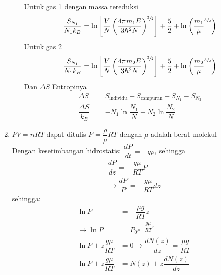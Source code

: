 \begin{enumerate}
\begin{enumerate}[(a)]
\begin{equation*}
    \end{equation*}
    Untuk gas 1 dengan massa tereduksi
    \begin{equation*}
        \dfrac{S_{N_1}}{N_1k_B}=\ln\left[\dfrac{V}{N}\left(\dfrac{4\pi m_1 E}{3h^2N}\right)^{\sfrac{3}{2}}\right]+\dfrac{5}{2}+\ln\left(\dfrac{m_1}{\mu}^{\sfrac{3}{2}}\right)
    \end{equation*}
    Untuk gas 2
    \begin{equation*}
        \dfrac{S_{N_1}}{N_1k_B}=\ln\left[\dfrac{V}{N}\left(\dfrac{4\pi m_2 E}{3h^2N}\right)^{\sfrac{3}{2}}\right]+\dfrac{5}{2}+\ln\left(\dfrac{m_2}{\mu}^{\sfrac{3}{2}}\right)
    \end{equation*}
    Dan $\Delta S$ Entropinya
    \begin{equation*}
        \begin{split}
            \Delta S&=S_{\text{individu}}+S_{\text{campuran}}-S_{N_1}-S_{N_2}\\
            \dfrac{\Delta S}{k_B}&=-N_1\ln\dfrac{N_1}{N}-N_2\ln\dfrac{N_2}{N}
        \end{split}
    \end{equation*}
    \end{enumerate}
    \item $PV=nRT$ dapat ditulis $P=\dfrac{\rho}{\mu}RT$ dengan $\mu$ adalah berat molekul\\
    Dengan kesetimbangan hidrostatis: $\dfrac{dP}{dt}=-q\rho$, sehingga
    \begin{equation*}
        \begin{split}
            \dfrac{dP}{dz}=-\dfrac{q\mu}{RT}P\\
            \rightarrow \dfrac{dP}{P}=-\dfrac{g\mu}{RT}dz
        \end{split}
    \end{equation*}
    sehingga:
    \begin{equation*}
        \begin{split}
            \ln P&=-\dfrac{\mu g}{RT}z\\
            \rightarrow \ln P&=P_0 e^{-\dfrac{g\mu}{RT}z}\\
            \ln P+z\dfrac{g\mu}{RT}&=0\rightarrow \dfrac{dN(z)}{dz}=\dfrac{\mu g}{RT}\\
            \ln P+z\dfrac{g\mu}{RT}&=N(z)+z\dfrac{dN(z)}{dz}
        \end{split}
    \end{equation*}
\end{enumerate}